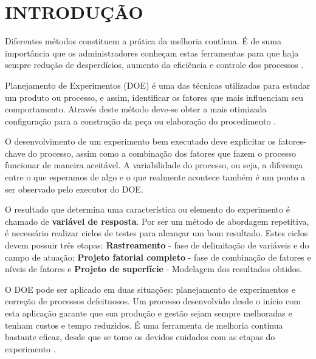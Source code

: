 \chapter{INTRODUÇÃO}
    Diferentes métodos constituem a prática da melhoria contínua. É de suma importância que os administradores conheçam estas ferramentas para que haja sempre redução de desperdícios, aumento da eficiência e controle dos processos \cite{entenda_doe}.

    Planejamento de Experimentos (\ac{DOE}) é uma das técnicas utilizadas para estudar um produto ou processo, e assim, identificar os fatores que mais influenciam seu comportamento. Através deste método deve-se obter a mais otimizada configuração para a construção da peça ou elaboração do procedimento \cite{oquee_doe}.

    O desenvolvimento de um experimento bem executado deve explicitar os fatores-chave do processo, assim como a combinação dos fatores que fazem o processo funcionar de maneira aceitável. A variabilidade do processo, ou seja, a diferença entre o que esperamos de algo e o que realmente acontece também é um ponto a ser observado pelo executor do \ac{DOE}.

    O resultado que determina uma característica ou elemento do experimento é chamado de \textbf{variável de resposta}. Por ser um método de abordagem repetitiva, é necessário realizar ciclos de testes para alcançar um bom resultado. Estes ciclos devem possuir três etapas: \textbf{Rastreamento} - fase de delimitação de variáveis e do campo de atuação; \textbf{Projeto fatorial completo} - fase de combinação de fatores e níveis de fatores e \textbf{Projeto de superfície} - Modelagem dos resultados obtidos.   

    O \ac{DOE} pode ser aplicado em duas situações: planejamento de experimentos e correção de processos defeituosos. Um processo desenvolvido desde o início com esta aplicação garante que sua produção e gestão sejam sempre melhoradas e tenham custos e tempo reduzidos. É uma ferramenta de melhoria contínua bastante eficaz, desde que se tome os devidos cuidados com as etapas do experimento \cite{oquee_doe}.


    
    
    


